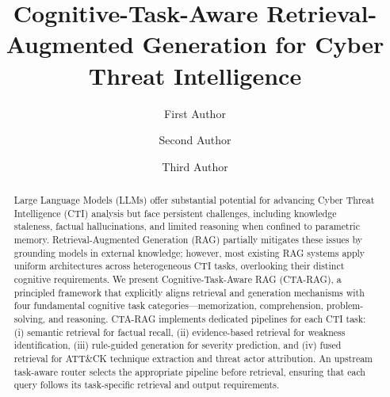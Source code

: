 \documentclass[5p,times,authoryear]{elsarticle}
\begin{document}
\begin{frontmatter}


\title{Cognitive-Task-Aware Retrieval-Augmented Generation for Cyber Threat Intelligence}


\author[1]{First Author}

\author[1]{Second Author}

\author[2]{Third Author}



\address[1]{Department of Computer Science, University Name, City, Country}

\address[2]{Department, Institution Name, City, Country}


\begin{abstract}
Large Language Models (LLMs) offer substantial potential for advancing Cyber Threat Intelligence (CTI) analysis but face persistent challenges, including knowledge staleness, factual hallucinations, and limited reasoning when confined to parametric memory. Retrieval-Augmented Generation (RAG) partially mitigates these issues by grounding models in external knowledge; however, most existing RAG systems apply uniform architectures across heterogeneous CTI tasks, overlooking their distinct cognitive requirements. We present Cognitive-Task-Aware RAG (CTA-RAG), a principled framework that explicitly aligns retrieval and generation mechanisms with four fundamental cognitive task categories—memorization, comprehension, problem-solving, and reasoning. CTA-RAG implements dedicated pipelines for each CTI task: (i) semantic retrieval for factual recall, (ii) evidence-based retrieval for weakness identification, (iii) rule-guided generation for severity prediction, and (iv) fused retrieval for ATT\&CK technique extraction and threat actor attribution. An upstream task-aware router selects the appropriate pipeline before retrieval, ensuring that each query follows its task-specific retrieval and output requirements.


\end{abstract}
\end{frontmatter}
\end{document}
